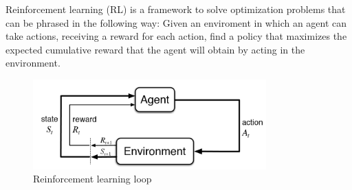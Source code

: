 \documentclass{../main.tex}{subfiles}
\begin{document}
Reinforcement learning (RL) is a framework to solve optimization problems that can be phrased in the following way: Given an enviroment in which an agent can take actions, receiving a reward for each action, find a policy that maximizes the expected cumulative reward that the agent will obtain by acting in the environment.

\begin{figure}[h]
    \centering
    \includegraphics[width=0.8\textwidth]{images/rl-loop}
    \caption{Reinforcement learning loop}
    \label{fig:rl-loop}
\end{figure}
\end{document}
